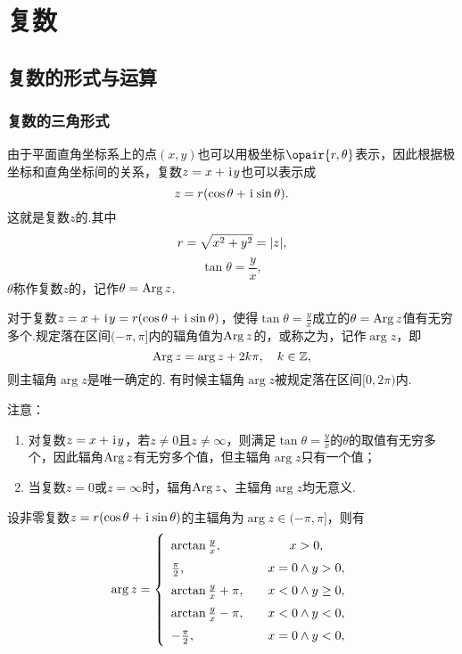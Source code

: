 \chapter{复数}
\section{复数的形式与运算}
\subsection{复数的三角形式}
\begin{definition}[复数的三角形式]
由于平面直角坐标系上的点\((x,y)\)也可以用极坐标\(\opair{r,\theta}\)表示，因此根据极坐标和直角坐标间的关系，复数\(z=x+\kern1pt\mathrm{i}\kern1pt y\)也可以表示成\[
z = r(\cos\theta+\kern1pt\mathrm{i}\kern1pt\sin\theta).
\]这就是复数\(z\)的.其中\[
r = \sqrt{x^2+y^2} = \abs{z},
\]\[
\tan\theta = \frac{y}{x},
\]\(\theta\)称作复数\(z\)的，记作\(\theta = \operatorname{Arg}{z}\).

对于复数\(z=x+\kern1pt\mathrm{i}\kern1pt y=r(\cos\theta+\kern1pt\mathrm{i}\kern1pt\sin\theta)\)，使得\(\tan\theta=\frac{y}{x}\)成立的\(\theta=\operatorname{Arg}{z}\)值有无穷多个.规定落在区间\((-\pi,\pi]\)内的辐角值为\(\operatorname{Arg}{z}\)的，或称之为，记作\(\arg{z}\)，即\[
\operatorname{Arg}{z} = \arg{z} + 2k\pi, \quad k\in\mathbb{Z},
\]则主辐角\(\arg{z}\)是唯一确定的.
有时候主辐角\(\arg{z}\)被规定落在区间\([0,2\pi)\)内.

注意：\begin{enumerate}
\item 对复数\(z = x + \kern1pt\mathrm{i}\kern1pt y\)，若\(z \neq 0\)且\(z \neq \infty\)，则满足\(\tan \theta = \frac{y}{x}\)的\(\theta\)的取值有无穷多个，因此辐角\(\operatorname{Arg} z\)有无穷多个值，但主辐角\(\arg z\)只有一个值；
\item 当复数\(z = 0\)或\(z = \infty\)时，辐角\(\operatorname{Arg}{z}\)、主辐角\(\arg{z}\)均无意义.
\end{enumerate}
\end{definition}

\begin{theorem}
设非零复数\(z=r(\cos\theta+\kern1pt\mathrm{i}\kern1pt\sin\theta)\)的主辐角为\(\arg{z} \in (-\pi,\pi]\)，则有\[
\def\arraystretch{1.5}
\arg{z} = \left\{ \begin{array}{lc}
\arctan{\frac{y}{x}}, &\quad x > 0, \\
\frac{\pi}{2}, &\quad x = 0 \land y > 0, \\
\arctan{\frac{y}{x}} + \pi, &\quad x < 0 \land y \geq 0, \\
\arctan{\frac{y}{x}} - \pi, &\quad x < 0 \land y < 0, \\
-\frac{\pi}{2}, &\quad x = 0 \land y < 0,
\end{array} \right.
\]
\end{theorem}

